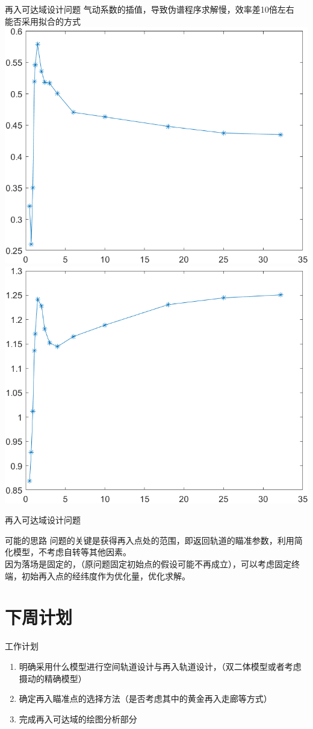 \documentclass[11pt,UTF8]{ctexbeamer}
\begin{document}
\begin{frame}{再入可达域设计问题}
	气动系数的插值，导致伪谱程序求解慢，效率差10倍左右\\
	能否采用拟合的方式\\
	\includegraphics[height=.4\textheight]{Ma_Cl.png}
	\includegraphics[height=.4\textheight]{Ma_Cd.png}

\end{frame}
\begin{frame}{再入可达域设计问题}
	\begin{block}{可能的思路}
		问题的关键是获得再入点处的范围，即返回轨道的瞄准参数，利用简化模型，不考虑自转等其他因素。\\
		因为落场是固定的，（原问题固定初始点的假设可能不再成立），可以考虑固定终端，初始再入点的经纬度作为优化量，优化求解。
	\end{block}
\end{frame}
\section{下周计划}
\begin{frame}{工作计划}
	\begin{block}{}
		\begin{enumerate}
			\item 明确采用什么模型进行空间轨道设计与再入轨道设计，（双二体模型或者考虑摄动的精确模型）
			\item 确定再入瞄准点的选择方法（是否考虑其中的黄金再入走廊等方式）
			\item 完成再入可达域的绘图分析部分
		\end{enumerate}
	\end{block}
\end{frame}
\end{document}
